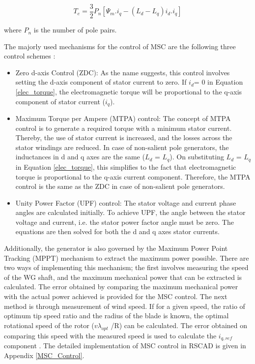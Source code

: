 \begin{equation}\label{elec_torque}
T_e = \frac{3}{2}P_n[\Psi_m.i_q-(L_d-L_q)i_d.i_q]    
\end{equation}

where $P_n$ is the number of pole pairs.

The majorly used mechanisms for the control of \gls{MSC} are the following three control schemes \cite{wu_variable-speed_2011}:

\begin{itemize}
    \item Zero d-axis Control (ZDC): As the name suggests, this control involves setting the d-axis component of stator current to zero. If $i_d$= 0 in Equation \ref{elec_torque}, the electromagnetic torque will be proportional to the q-axis component of stator current ($i_q$).  
    \item Maximum Torque per Ampere (MTPA) control: The concept of MTPA control is to generate a required torque with a minimum stator current. Thereby, the use of stator current is increased, and the losses across the stator windings are reduced. In case of non-salient pole generators, the inductances in d and q axes are the same ($L_d$ = $L_q$). On substituting $L_d$ = $L_q$ in Equation \ref{elec_torque}, this simplifies to the fact that electromagnetic torque is proportional to the q-axis current component. Therefore, the MTPA control is the same as the ZDC in case of non-salient pole generators. 
    \item Unity Power Factor (UPF) control: The stator voltage and current phase angles are calculated initially. To achieve UPF, the angle between the stator voltage and current, i.e. the stator power factor angle must be zero. The equations are then solved for both the d and q axes stator currents. 
\end{itemize}

Additionally, the generator is also governed by the Maximum Power Point Tracking (\gls{MPPT}) mechanism to extract the maximum power possible. There are two ways of implementing this mechanism; the first involves measuring the speed of the \gls{WG} shaft, and the maximum mechanical power that can be extracted is calculated. The error obtained by comparing the maximum mechanical power with the actual power achieved is provided for the \gls{MSC} control. The next method is through measurement of wind speed. If for a given speed, the ratio of optimum tip speed ratio and the radius of the blade is known, the optimal rotational speed of the rotor ($v\lambda_{opt}$ /R) can be calculated. The error obtained on comparing this speed with the measured speed is used to calculate the $i_{q,ref}$ component \cite{ali_wind_2012}. The detailed implementation of \gls{MSC} control in RSCAD is given in Appendix \ref{MSC_Control}.  

